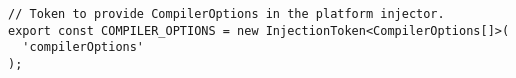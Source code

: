 \begin{verbatim}
// Token to provide CompilerOptions in the platform injector.
export const COMPILER_OPTIONS = new InjectionToken<CompilerOptions[]>(
  'compilerOptions'
);
\end{verbatim}
